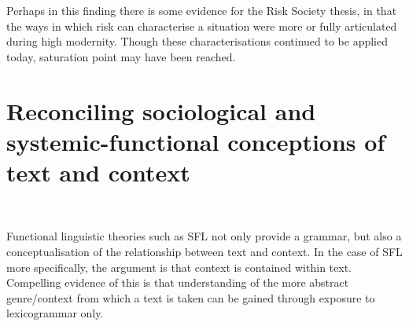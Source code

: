 	Perhaps in this finding there is some evidence for the Risk Society thesis, in that the ways in which risk can characterise a situation were more or fully articulated during high modernity. Though these characterisations continued to be applied today, saturation point may have been reached.



        
\section{Reconciling sociological and systemic-functional conceptions of text and context}

	
    ~\ 
    

    Functional linguistic theories such as SFL not only provide a grammar, but also a conceptualisation of the relationship between text and context. In the case of SFL more specifically, the argument is that context is contained within text. Compelling evidence of this is that understanding of the more abstract genre\slash context from which a text is taken can be gained through exposure to lexicogrammar only.

